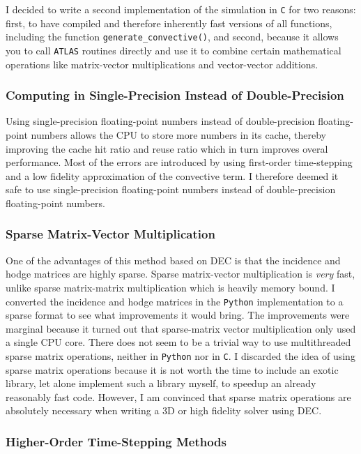 I decided to write a second implementation of the simulation in \texttt{C} for two reasons: first, to have compiled and therefore inherently fast versions of all functions, including the function \lstinline|generate_convective()|, and second, because it allows you to call \texttt{ATLAS} routines directly and use it to combine certain mathematical operations like matrix-vector multiplications and vector-vector additions.

\subsubsection{Computing in Single-Precision Instead of Double-Precision}

Using single-precision floating-point numbers instead of double-precision floating-point numbers allows the CPU to store more numbers in its cache, thereby improving the cache hit ratio and reuse ratio which in turn improves overal performance. Most of the errors are introduced by using first-order time-stepping and a low fidelity approximation of the convective term. I therefore deemed it safe to use single-precision floating-point numbers instead of double-precision floating-point numbers.

\subsubsection{Sparse Matrix-Vector Multiplication}

One of the advantages of this method based on DEC is that the incidence and hodge matrices are highly sparse. Sparse matrix-vector multiplication is \emph{very} fast, unlike sparse matrix-matrix multiplication which is heavily memory bound. I converted the incidence and hodge matrices in the \texttt{Python} implementation to a sparse format to see what improvements it would bring. The improvements were marginal because it turned out that sparse-matrix vector multiplication only used a single CPU core. There does not seem to be a trivial way to use multithreaded sparse matrix operations, neither in \texttt{Python} nor in \texttt{C}. I discarded the idea of using sparse matrix operations because it is not worth the time to include an exotic library, let alone implement such a library myself, to speedup an already reasonably fast code. However, I am convinced that sparse matrix operations are absolutely necessary when writing a 3D or high fidelity solver using DEC.

\subsubsection{Higher-Order Time-Stepping Methods}

